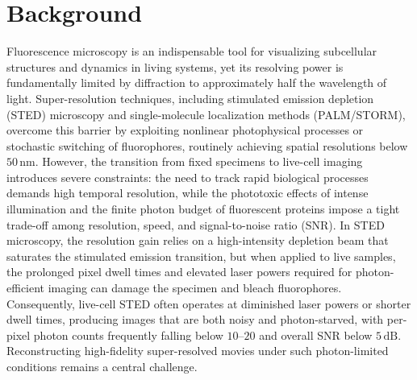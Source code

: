 \documentclass{article}
\begin{document}
\section{Background}
Fluorescence microscopy is an indispensable tool for visualizing subcellular structures and dynamics in living systems, yet its resolving power is fundamentally limited by diffraction to approximately half the wavelength of light. Super-resolution techniques, including stimulated emission depletion (STED) microscopy and single-molecule localization methods (PALM/STORM), overcome this barrier by exploiting nonlinear photophysical processes or stochastic switching of fluorophores, routinely achieving spatial resolutions below $50\,\text{nm}$. However, the transition from fixed specimens to live-cell imaging introduces severe constraints: the need to track rapid biological processes demands high temporal resolution, while the phototoxic effects of intense illumination and the finite photon budget of fluorescent proteins impose a tight trade-off among resolution, speed, and signal-to-noise ratio (SNR). In STED microscopy, the resolution gain relies on a high-intensity depletion beam that saturates the stimulated emission transition, but when applied to live samples, the prolonged pixel dwell times and elevated laser powers required for photon-efficient imaging can damage the specimen and bleach fluorophores. Consequently, live-cell STED often operates at diminished laser powers or shorter dwell times, producing images that are both noisy and photon-starved, with per-pixel photon counts frequently falling below $10$--$20$ and overall SNR below $5\,\text{dB}$. Reconstructing high-fidelity super-resolved movies under such photon-limited conditions remains a central challenge.
\end{document}
